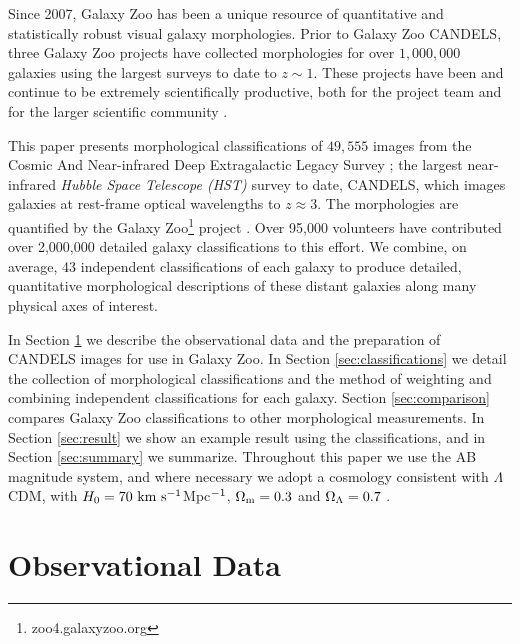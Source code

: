 \documentclass[useAMS,usenatbib]{mn2e}
\begin{document}
Since 2007, Galaxy Zoo has been a unique resource of quantitative and statistically robust visual galaxy morphologies. Prior to Galaxy Zoo CANDELS, three Galaxy Zoo projects have collected morphologies for over $1,000,000$ galaxies using the largest surveys to date to $z \sim 1$. These projects have been and continue to be extremely scientifically productive, both for the project team \citep[e.g.,][]{keel15,galloway15,willett15} and for the larger scientific community \citep[e.g.][]{amorin10,finkelman12,robaina12,combes13,joachimi15,lopezcorredoira15,zhang15}.

This paper presents morphological classifications of $49,555$ images from the Cosmic And Near-infrared Deep Extragalactic Legacy Survey \citep[CANDELS;][]{grogin11,koekemoer11}; the largest near-infrared \emph{Hubble Space Telescope (HST)} survey to date, CANDELS, which images galaxies at rest-frame optical wavelengths to $z \approx 3$. The morphologies are quantified by the Galaxy Zoo{\footnote{zoo4.galaxyzoo.org}} project \citep{lintott08}. Over 95,000 volunteers have contributed over 2,000,000 detailed galaxy classifications to this effort. We combine, on average, 43 independent classifications of each galaxy to produce detailed, quantitative morphological descriptions of these distant galaxies along many physical axes of interest. 

In Section \ref{sec:data} we describe the observational data and the preparation of CANDELS images for use in Galaxy Zoo. In Section \ref{sec:classifications} we detail the collection of morphological classifications and the method of weighting and combining independent classifications for each galaxy. Section \ref{sec:comparison} compares Galaxy Zoo classifications to other morphological measurements. In Section \ref{sec:result} we show an example result using the classifications, and in Section \ref{sec:summary} we summarize. Throughout
this paper we use the AB magnitude system, and where necessary we adopt a cosmology consistent with $\Lambda$CDM, with $H_{\rm 0}=70~{\rm
km~s^{-1}}$Mpc$^{\rm -1}$, $\Omega_{\rm m}=0.3$ and $\Omega_{\rm \Lambda}=0.7$ \citep{bennett13}.




%
%
\section{Observational Data}\label{sec:data}
%
%
\end{document}

